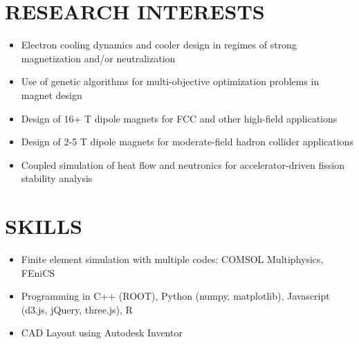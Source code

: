 \documentclass[11pt]{res} %
\begin{document}
\begin{resume}
\begin{itemize}
\end{itemize}
 
\section{RESEARCH INTERESTS}
\begin{itemize}
\item Electron cooling dynamics and cooler design in regimes of strong magnetization and/or neutralization
\item Use of genetic algorithms for multi-objective optimization problems in magnet design
\item Design of 16+ T dipole magnets for FCC and other high-field applications
\item Design of 2-5 T dipole magnets for moderate-field hadron collider applications
\item Coupled simulation of heat flow and neutronics for accelerator-driven fission stability analysis
\end{itemize}
 
\section{SKILLS}
\begin{itemize}
\item Finite element simulation with multiple codes: COMSOL Multiphysics, FEniCS
\item Programming in C++ (ROOT), Python (numpy, matplotlib), Javascript (d3.js, jQuery, three.js), R
\item CAD Layout using Autodesk Inventor
\end{itemize}

\end{resume}
\end{document}
